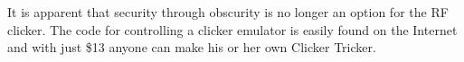 It is apparent that security through obscurity is no longer an option for the RF clicker.  The code for controlling a clicker emulator is easily found on the Internet and with just \$13 anyone can make his or her own Clicker Tricker.

